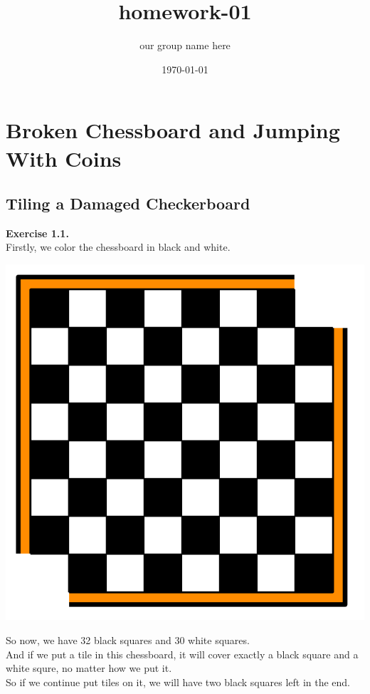 \documentclass{article}
\title{\textbf{homework-01}}
\author{our group name here}
\date{\today}
\begin{document}
\maketitle

\section{Broken Chessboard and Jumping With Coins}
\subsection{Tiling a Damaged Checkerboard}

\begin{flushleft}
\textbf{Exercise 1.1.} \\
Firstly, we color the chessboard in black and white.\\
\begin{center}
\includegraphics[scale=0.3]{1.png}
\end{center}
So now, we have 32 black squares and 30 white squares.\\
And if we put a tile in this chessboard, it will cover exactly a black square and a white squre, no matter how we put it.\\
So if we continue put tiles on it, we will have two black squares left in the end.\\

\end{flushleft}
\end{document}
